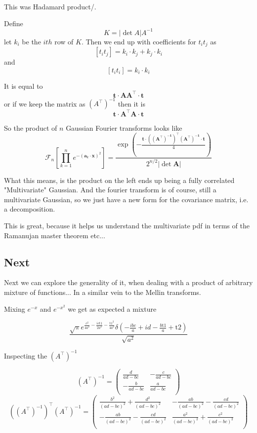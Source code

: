 \documentclass{article}
\begin{document}
This was Hadamard product/.


Define
$$
K = |\det A| A^{-1}
$$
let $k_i$ be the $ith$ row of $K$.
Then we end up with coefficients for $t_i t_j$ as 
$$
[t_i t_j] = k_i \cdot k_j + k_j \cdot k_i
$$
and
$$
[t_i t_i] = k_i \cdot k_i
$$


It is equal to 
$$
\mathbf{t} \cdot \mathbf{A A}^\top \cdot \mathbf{t}
$$
or if we keep the matrix as $(A^\top)^{-1}$ then it is
$$
\mathbf{t} \cdot \mathbf{A^\top A} \cdot \mathbf{t}
$$

So the product of $n$ Gaussian Fourier transforms looks like 
$$
\mathcal{F}_{n}\left[ \prod_{k=1}^n e^{-(\mathbf{a}_k\cdot\mathbf{x})^2} \right] = \frac{\exp\left(- \frac{\mathbf{t} \cdot \mathbf{((A^\top)^{-1})^\top (A^\top)^{-1}} \cdot \mathbf{t}}{4} \right)}{2^{n/2}|\det \mathbf{A}|}
$$

What this means, is the product on the left ends up being a fully correlated "Multivariate" Gaussian. And the fourier transform is of course, still a multivariate Gaussian, so we just have a new form for the covariance matrix, i.e. a decomposition.

This is great, because it helps us understand the multivariate pdf in terms of the Ramanujan master theorem etc...

\subsection{Next}
Next we can explore the generality of it, when dealing with a product of arbitrary mixture of functions... In a similar vein to the Mellin transforms.

Mixing $e^{-x}$ and $e^{-x^2}$ we get as expected a mixture

$$
\frac{\sqrt{\pi } e^{\frac{c^2}{4 a^2}-\frac{i c \text{t1}}{2 a^2}-\frac{\text{t1}^2}{4 a^2}} \delta \left(-\frac{i b c}{a}+i d-\frac{b \text{t1}}{a}+\text{t2}\right)}{\sqrt{a^2}}
$$

Inspecting the $(A^\top)^{-1}$

$$
(A^\top)^{-1} = \left(
                   \begin{array}{cc}
                    \frac{d}{a d-b c} & -\frac{c}{a d-b c} \\
                    -\frac{b}{a d-b c} & \frac{a}{a d-b c} \\
                   \end{array}
                   \right)
$$
 $$
            ((A^\top)^{-1})^\top (A^\top)^{-1} =      \left(
                   \begin{array}{cc}
                    \frac{b^2}{(a d-b c)^2}+\frac{d^2}{(a d-b c)^2} & -\frac{a b}{(a d-b c)^2}-\frac{c d}{(a d-b c)^2} \\
                    -\frac{a b}{(a d-b c)^2}-\frac{c d}{(a d-b c)^2} & \frac{a^2}{(a d-b c)^2}+\frac{c^2}{(a d-b c)^2} \\
                   \end{array}
                   \right)
                   $$
                   
\end{document}
